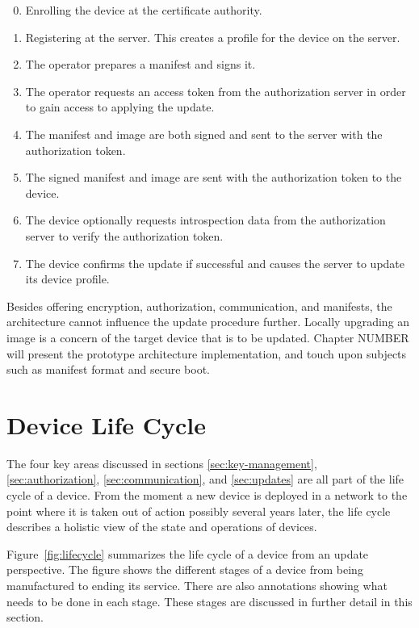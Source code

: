 \documentclass[0-thesis.tex]{subfiles}
\begin{document}
\begin{enumerate}[label=0.\arabic*]
    \setcounter{enumi}{-1}
    \item Enrolling the device at the certificate authority.
    \item Registering at the server. This creates a profile for the device on the server.
    \item The operator prepares a manifest and signs it.
    \item The operator requests an access token from the authorization server in order to
            gain access to applying the update.
    \item The manifest and image are both signed and sent to the server with the
            authorization token.
    \item The signed manifest and image are sent with the authorization token to the
            device.
    \item The device optionally requests introspection data from the authorization server
            to verify the authorization token.
    \item The device confirms the update if successful and causes the server to update
            its device profile.
\end{enumerate}

Besides offering encryption, authorization, communication, and manifests, the architecture
cannot influence the update procedure further. Locally upgrading an image is a concern of
the target device that is to be updated. Chapter NUMBER will present the prototype
architecture implementation, and touch upon subjects such as manifest format and secure
boot.

\section{Device Life Cycle}
\label{sec:device-lifecycle}
The four key areas discussed in sections \ref{sec:key-management},
\ref{sec:authorization}, \ref{sec:communication}, and \ref{sec:updates} are all part of
the life cycle of a device. From the moment a new device is deployed in a network to the
point where it is taken out of action possibly several years later, the life cycle
describes a holistic view of the state and operations of devices.

Figure~\ref{fig:lifecycle} summarizes the life cycle of a device from an update
perspective. The figure shows the different stages of a device from being manufactured to
ending its service. There are also annotations showing what needs to be done in each
stage. These stages are discussed in further detail in this section.
\end{document}
